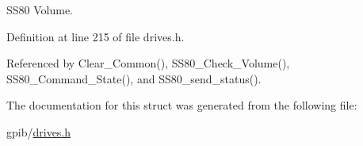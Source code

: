 S\+S80 Volume. 



Definition at line 215 of file drives.\+h.



Referenced by Clear\+\_\+\+Common(), S\+S80\+\_\+\+Check\+\_\+\+Volume(), S\+S80\+\_\+\+Command\+\_\+\+State(), and S\+S80\+\_\+send\+\_\+status().



The documentation for this struct was generated from the following file\+:\begin{DoxyCompactItemize}
\item 
gpib/\hyperlink{drives_8h}{drives.\+h}\end{DoxyCompactItemize}
